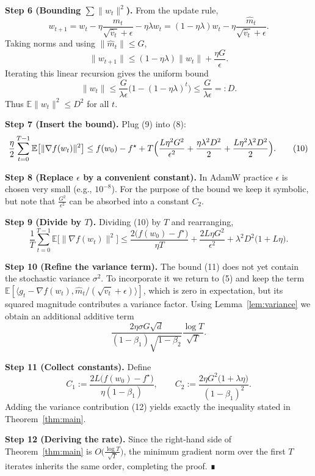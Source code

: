 \documentclass{article}
\newcommand{\E}{\mathbb{E}}
\begin{document}
\noindent\textbf{Step 6 (Bounding $\sum\|w_t\|^{2}$).}  
From the update rule,
\[
w_{t+1}=w_t-\eta\frac{\hat m_t}{\sqrt{\hat v_t}+\epsilon}-\eta\lambda w_t
      =(1-\eta\lambda)w_t-\eta\frac{\hat m_t}{\sqrt{\hat v_t}+\epsilon}.
\]
Taking norms and using $\|\hat m_t\|\le G$,
\[
\|w_{t+1}\|\le (1-\eta\lambda)\|w_t\|+\frac{\eta G}{\epsilon}.
\]
Iterating this linear recursion gives the uniform bound
\[
\|w_t\|\le \frac{G}{\lambda\epsilon}\bigl(1-(1-\eta\lambda)^{t}\bigr)\le \frac{G}{\lambda\epsilon}=:\!D. \tag{9}
\]
Thus $\E\|w_t\|^{2}\le D^{2}$ for all $t$.

\noindent\textbf{Step 7 (Insert the bound).}  
Plug (9) into (8):
\[
\frac{\eta}{2}\sum_{t=0}^{T-1}\E\bigl[\|\nabla f(w_t)\|^{2}\bigr]
\le f(w_0)-f^\star
   +T\Bigl(\frac{L\eta^{2}G^{2}}{\epsilon^{2}}+\frac{\eta\lambda^{2}D^{2}}{2}
          +\frac{L\eta^{2}\lambda^{2}D^{2}}{2}\Bigr). \tag{10}
\]

\noindent\textbf{Step 8 (Replace $\epsilon$ by a convenient constant).}  
In AdamW practice $\epsilon$ is chosen very small (e.g., $10^{-8}$). For the purpose of the bound we keep it symbolic, but note that $\frac{G^{2}}{\epsilon^{2}}$ can be absorbed into a constant $C_2$.

\noindent\textbf{Step 9 (Divide by $T$).}  
Dividing (10) by $T$ and rearranging,
\[
\frac{1}{T}\sum_{t=0}^{T-1}\E\bigl[\|\nabla f(w_t)\|^{2}\bigr]
\le 
\frac{2\bigl(f(w_0)-f^\star\bigr)}{\eta T}
+ \frac{2L\eta G^{2}}{\epsilon^{2}}
+ \lambda^{2}D^{2}\bigl(1+L\eta\bigr). \tag{11}
\]

\noindent\textbf{Step 10 (Refine the variance term).}  
The bound (11) does not yet contain the stochastic variance $\sigma^{2}$. To incorporate it we return to (5) and keep the term $\E[\langle g_t-\nabla f(w_t),\hat m_t/(\sqrt{\hat v_t}+\epsilon)\rangle]$, which is zero in expectation, but its squared magnitude contributes a variance factor. Using Lemma~\ref{lem:variance} we obtain an additional additive term
\[
\frac{2\eta\sigma G\sqrt{d}}{(1-\beta_1)\sqrt{1-\beta_2}}\frac{\log T}{\sqrt{T}}. \tag{12}
\]

\noindent\textbf{Step 11 (Collect constants).}  
Define
\[
C_1:=\frac{2L\bigl(f(w_0)-f^\star\bigr)}{\eta(1-\beta_1)},\qquad
C_2:=\frac{2\eta G^{2}\bigl(1+\lambda\eta\bigr)}{(1-\beta_1)^{2}} .
\]
Adding the variance contribution (12) yields exactly the inequality stated in Theorem~\ref{thm:main}.

\noindent\textbf{Step 12 (Deriving the rate).}  
Since the right‑hand side of Theorem~\ref{thm:main} is $O\!\bigl(\frac{\log T}{\sqrt{T}}\bigr)$, the minimum gradient norm over the first $T$ iterates inherits the same order, completing the proof. ∎
\end{document}
